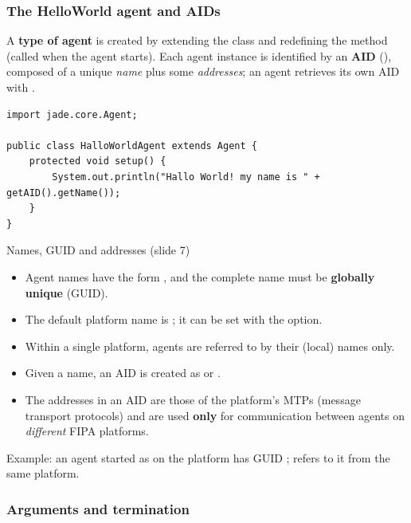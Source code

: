 \subsubsection{The HelloWorld agent and AIDs}

A \textbf{type of agent} is created by extending the  class and
redefining the  method (called when the agent starts). Each agent instance is
identified by an \textbf{AID} (), composed of a unique \emph{name} plus
some \emph{addresses}; an agent retrieves its own AID with .
\begin{verbatim}
import jade.core.Agent;

public class HalloWorldAgent extends Agent {
    protected void setup() {
        System.out.println("Hallo World! my name is " + getAID().getName());
    }
}
\end{verbatim}

\begin{nbfact}{Names, GUID and addresses (slide 7)}
\begin{itemize}[nosep]
  \item Agent names have the form , and the complete
        name must be \textbf{globally unique} (GUID).
  \item The default platform name is ; it can be set with
        the  option.
  \item Within a single platform, agents are referred to by their (local) names only.
  \item Given a name, an AID is created as  or
        .
  \item The addresses in an AID are those of the platform's MTPs (message transport
        protocols) and are used \textbf{only} for communication between agents on
        \emph{different} FIPA platforms.
\end{itemize}
Example: an agent started as  on the platform  has GUID
;  refers to it from
the same platform.
\end{nbfact}

\subsubsection{Arguments and termination}

